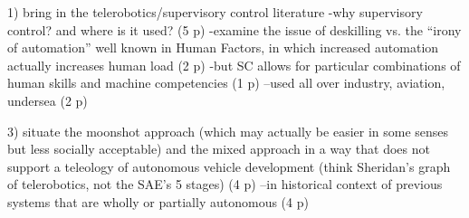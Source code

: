 1) bring in the telerobotics/supervisory control literature
-why supervisory control? and where is it used? (5 p)
-examine the issue of deskilling vs. the ``irony of automation'' well
known in Human Factors, in which increased automation actually
increases human load (2 p)
-but SC allows for particular combinations of human skills and machine
competencies (1 p)
--used all over industry, aviation, undersea (2 p)


3) situate the moonshot approach (which may actually be easier in some
senses but less socially acceptable) and the mixed approach in a way
that does not support a teleology of autonomous vehicle development
(think Sheridan's graph of telerobotics, not the SAE's 5 stages) (4 p)
--in historical context of previous systems that are wholly or
partially autonomous (4 p)





